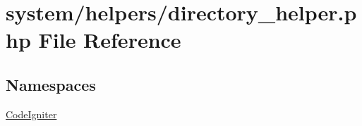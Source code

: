 \hypertarget{directory__helper_8php}{}\section{system/helpers/directory\+\_\+helper.php File Reference}
\label{directory__helper_8php}
\subsection*{Namespaces}
\begin{DoxyCompactItemize}
\item 
 \mbox{\hyperlink{namespace_code_igniter}{Code\+Igniter}}
\end{DoxyCompactItemize}
